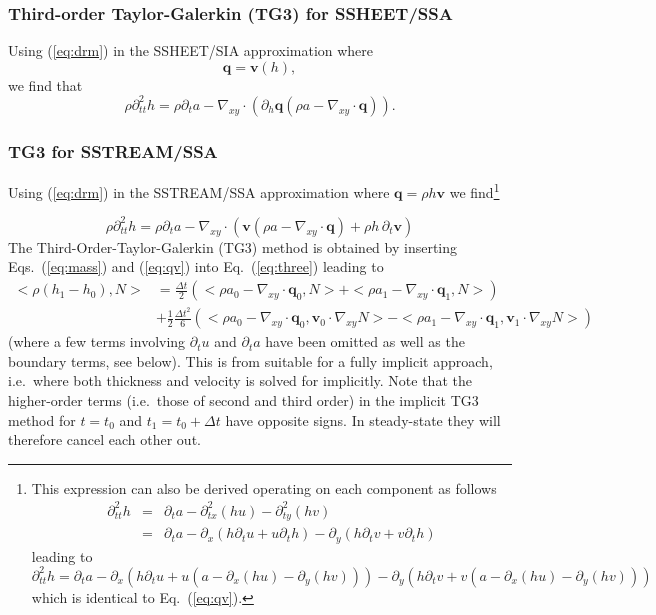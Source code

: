 \documentclass[10pt,a4paper]{book}
\newcommand{\p}{\partial}
\begin{document}
\subsubsection{Third-order Taylor-Galerkin (TG3) for SSHEET/SSA}

Using (\ref{eq:drm}) in the  SSHEET/SIA approximation where
\[
\bm{q}=\bm{v}(h) ,
\]
we find that
\[
\rho \p^2_{tt} h=\rho \p_t a - \nabla_{xy} \cdot ( \p_h \bm{q} (\rho a -\nabla_{xy} \cdot \bm{q})).
\]


\subsubsection{TG3 for SSTREAM/SSA}
Using (\ref{eq:drm}) in the SSTREAM/SSA approximation where $\bm{q}=\rho h \bm{v}$ we
find\footnote{This expression can also be derived operating on each
  component as follows
\begin{eqnarray*}
\p^2_{tt} h &=& \p_t a -\p^2_{tx} ( h u) -\p^2_{ty} ( h v ) \nonumber \\
            &=& \p_t a -\p_x ( h \p_t u+ u \p_t h ) -\p_{y} ( h \p_t v + v \p_t h ) \nonumber 
\end{eqnarray*}
leading to
\begin{equation}
            \p^2_{tt} h= \p_t a -\p_x ( h \p_t u+ u (a- \p_x(h u) - \p_y (h v)) ) -\p_{y} ( h \p_t v + v (a- \p_x(h u) - \p_y (h v)) ) 
\label{eq:tw}
\end{equation}
which is identical to Eq.~(\ref{eq:qv}).}  


\begin{equation}
\rho \p^2_{tt} h = \rho \p_t a-  \nabla_{xy} \cdot ( \bm{v}  (\rho a-\nabla_{xy} \cdot \bm{q}) + \rho h \, \p_t \bm{v})
\label{eq:qv}
\end{equation}
The Third-Order-Taylor-Galerkin (TG3) method is obtained by inserting
Eqs.~(\ref{eq:mass}) and (\ref{eq:qv}) into Eq.~(\ref{eq:three})
leading to
\begin{align} \label{eq:TG3i}
  <\rho (h_1-h_0), N> &=  \frac{\Delta t}{2} \left (  <\rho a_0- \nabla_{xy} \cdot \bm{q}_0 , N> +  <\rho a_1- \nabla_{xy} \cdot \bm{q}_1 , N>   \right ) \\
  &+ \frac{1}{2} \frac{\Delta t^2}{6}
   \left ( <\rho a_0- \nabla_{xy} \cdot \bm{q}_{0} ,  \bm{v}_0 \cdot \nabla_{xy} N>
         -  <\rho a_1- \nabla_{xy} \cdot \bm{q}_{1} ,  \bm{v}_1 \cdot \nabla_{xy} N> \right ) \nonumber
\end{align}
(where a few terms involving $\p_t u$ and $\p_t a$ have been omitted
as well as the boundary terms, see below). This is from suitable for a
fully implicit approach, i.e.\ where both thickness and velocity is
solved for implicitly. Note that the higher-order terms (i.e.\ those
of second and third order) in the implicit TG3 method for $t=t_0$ and
$t_1=t_0+\Delta t$ have opposite signs.  In steady-state they will
therefore cancel each other out.
\end{document}
